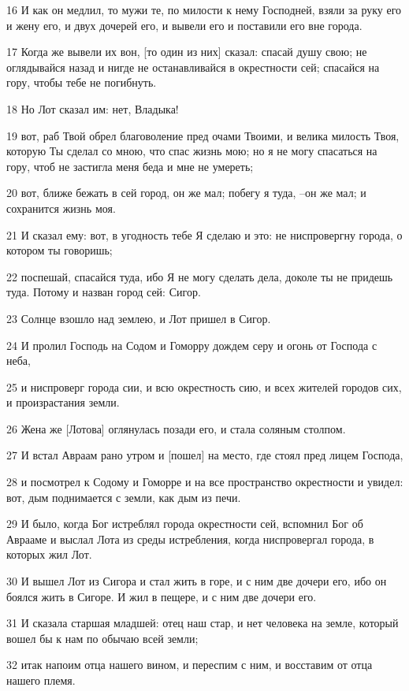 \par 16 И как он медлил, то мужи те, по милости к нему Господней, взяли за руку его и жену его, и двух дочерей его, и вывели его и поставили его вне города.
\par 17 Когда же вывели их вон, [то один из них] сказал: спасай душу свою; не оглядывайся назад и нигде не останавливайся в окрестности сей; спасайся на гору, чтобы тебе не погибнуть.
\par 18 Но Лот сказал им: нет, Владыка!
\par 19 вот, раб Твой обрел благоволение пред очами Твоими, и велика милость Твоя, которую Ты сделал со мною, что спас жизнь мою; но я не могу спасаться на гору, чтоб не застигла меня беда и мне не умереть;
\par 20 вот, ближе бежать в сей город, он же мал; побегу я туда, --он же мал; и сохранится жизнь моя.
\par 21 И сказал ему: вот, в угодность тебе Я сделаю и это: не ниспровергну города, о котором ты говоришь;
\par 22 поспешай, спасайся туда, ибо Я не могу сделать дела, доколе ты не придешь туда. Потому и назван город сей: Сигор.
\par 23 Солнце взошло над землею, и Лот пришел в Сигор.
\par 24 И пролил Господь на Содом и Гоморру дождем серу и огонь от Господа с неба,
\par 25 и ниспроверг города сии, и всю окрестность сию, и всех жителей городов сих, и произрастания земли.
\par 26 Жена же [Лотова] оглянулась позади его, и стала соляным столпом.
\par 27 И встал Авраам рано утром и [пошел] на место, где стоял пред лицем Господа,
\par 28 и посмотрел к Содому и Гоморре и на все пространство окрестности и увидел: вот, дым поднимается с земли, как дым из печи.
\par 29 И было, когда Бог истреблял города окрестности сей, вспомнил Бог об Аврааме и выслал Лота из среды истребления, когда ниспровергал города, в которых жил Лот.
\par 30 И вышел Лот из Сигора и стал жить в горе, и с ним две дочери его, ибо он боялся жить в Сигоре. И жил в пещере, и с ним две дочери его.
\par 31 И сказала старшая младшей: отец наш стар, и нет человека на земле, который вошел бы к нам по обычаю всей земли;
\par 32 итак напоим отца нашего вином, и переспим с ним, и восставим от отца нашего племя.
